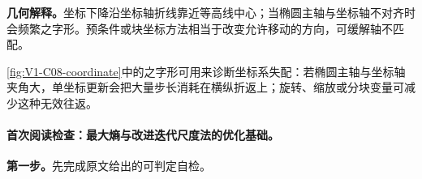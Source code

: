 \documentclass[UTF8,a4paper,11pt,openany]{ctexbook}
\begin{document}
\setcounter{page}{145}
\setcounter{chapter}{8}
\setcounter{figure}{0}
\pagestyle{headings}
\begin{geometrybox}
\textbf{几何解释。}坐标下降沿坐标轴折线靠近等高线中心；当椭圆主轴与坐标轴不对齐时会频繁之字形。预条件或块坐标方法相当于改变允许移动的方向，可缓解轴不匹配。
\end{geometrybox}

\cref{fig:V1-C08-coordinate}中的之字形可用来诊断坐标系失配：若椭圆主轴与坐标轴夹角大，单坐标更新会把大量步长消耗在横纵折返上；旋转、缩放或分块变量可减少这种无效往返。
\paragraph{首次阅读检查：最大熵与改进迭代尺度法的优化基础。}\textbf{第一步。}先完成原文给出的可判定自检。
\end{document}
